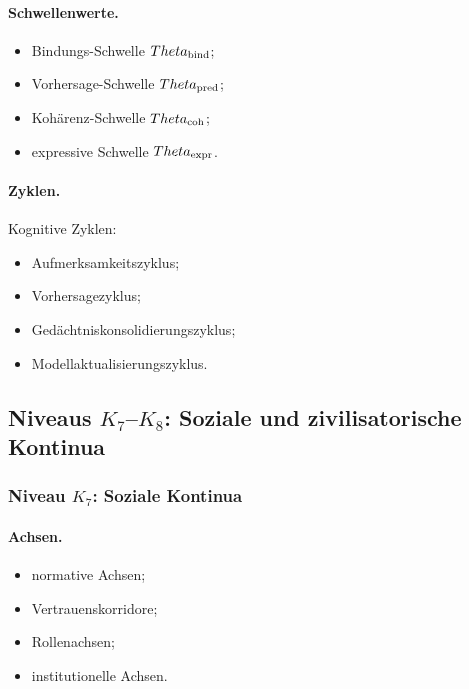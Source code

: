 \paragraph{Schwellenwerte.}
\begin{itemize}
    \item Bindungs-Schwelle \(\Theta_{\rm bind}\);
    \item Vorhersage-Schwelle \(\Theta_{\rm pred}\);
    \item Kohärenz-Schwelle \(\Theta_{\rm coh}\);
    \item expressive Schwelle \(\Theta_{\rm expr}\).
\end{itemize}

\paragraph{Zyklen.}
Kognitive Zyklen:
\begin{itemize}
    \item Aufmerksamkeitszyklus;
    \item Vorhersagezyklus;
    \item Gedächtniskonsolidierungszyklus;
    \item Modellaktualisierungszyklus.
\end{itemize}

\subsection{Niveaus \texorpdfstring{\texorpdfstring{$K_7$}{K\_7}–\texorpdfstring{$K_8$}{K\_8}}{K7–K8}: Soziale und zivilisatorische Kontinua}

\subsubsection{Niveau \texorpdfstring{\(K_7\)}{K7}: Soziale Kontinua}

\paragraph{Achsen.}
\begin{itemize}
    \item normative Achsen;
    \item Vertrauenskorridore;
    \item Rollenachsen;
    \item institutionelle Achsen.
\end{itemize}


